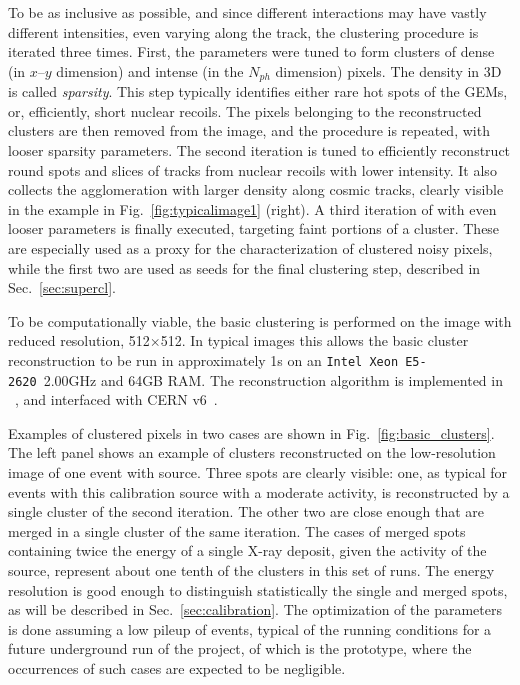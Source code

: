 To be as inclusive as possible, and since different interactions may
have vastly different intensities, even varying along the track, the
clustering procedure is iterated three times.  First, the \dbscan
parameters were tuned to form clusters of dense (in $x$--$y$ dimension)
and intense (in the $N_{ph}$ dimension) pixels. The density in 3D is
called \textit{sparsity}.  This step typically identifies either rare
hot spots of the GEMs, or, efficiently, short nuclear recoils. The
pixels belonging to the reconstructed clusters are then removed from
the image, and the \dbscan procedure is repeated, with looser sparsity
parameters. The second iteration is tuned to efficiently reconstruct
\fe round spots and slices of tracks from nuclear recoils with lower
intensity. It also collects the agglomeration with larger density
along cosmic tracks, clearly visible in the example in
Fig.~\ref{fig:typicalimage1} (right).  A third iteration of \dbscan
with even looser parameters is finally executed, targeting faint
portions of a cluster. These are especially used as a proxy for the
characterization of clustered noisy pixels, while the first two are
used as seeds for the final clustering step, described in
Sec.~\ref{sec:supercl}.

To be computationally viable, the \idbscan basic clustering is
performed on the image with reduced resolution, 512$\times$512. In
typical images this allows the basic cluster reconstruction to be run
in approximately 1\unit{s} on an \texttt{Intel Xeon
E5-2620}~2.00\unit{GHz} and 64\unit{GB} RAM. The reconstruction
algorithm is implemented in \PYTHONthree~\cite{python3}, and
interfaced with CERN \ROOT v6~\cite{root}.


Examples of clustered pixels in two cases are shown in
Fig.~\ref{fig:basic_clusters}. The left panel shows an example of
clusters reconstructed on the low-resolution image of one event
with \fe source. Three spots are clearly visible: one, as typical for
events with this calibration source with a moderate activity, is
reconstructed by a single cluster of the second iteration. The other
two are close enough that are merged in a single cluster of the same
iteration. The cases of merged spots containing twice the energy of a
single X-ray deposit, given the activity of the \fe source, represent
about one tenth of the clusters in this set of runs. The energy
resolution is good enough to distinguish statistically the single and
merged spots, as will be described in Sec.~\ref{sec:calibration}.  The
optimization of the \idbscan parameters is done assuming a low pileup
of events, typical of the running conditions for a future underground
run of the \cygno project, of which \lemon is the prototype, where the
occurrences of such cases are expected to be negligible.

